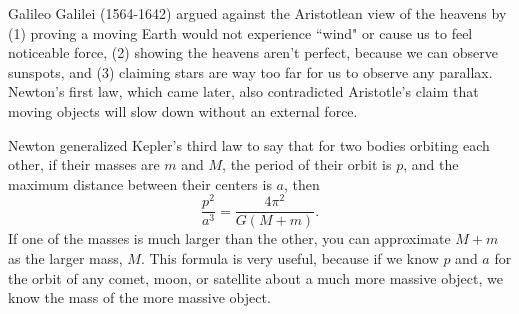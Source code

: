 \documentclass[class=article, crop=false]{standalone}
\begin{document}
\par
Galileo Galilei (1564-1642) argued against the Aristotlean view of the heavens by (1) proving a moving Earth would not experience ``wind" or cause us to feel noticeable force, (2) showing the heavens aren't perfect, because we can observe sunspots, and (3) claiming stars are way too far for us to observe any parallax. Newton's first law, which came later, also contradicted Aristotle's claim that moving objects will slow down without an external force.
\par
Newton generalized Kepler's third law to say that for two bodies orbiting each other, if their masses are $m$ and $M$, the period of their orbit is $p$, and the maximum distance between their centers is $a$, then
\[ \frac{p^2}{a^3} = \frac{4\pi^2}{G (M+m)}. \]
If one of the masses is much larger than the other, you can approximate $M+m$ as the larger mass, $M$. This formula is very useful, because if we know $p$ and $a$ for the orbit of any comet, moon, or satellite about a much more massive object, we know the mass of the more massive object.
\end{document}
